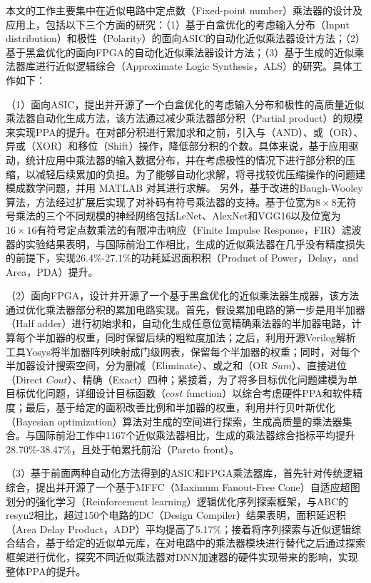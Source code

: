 本文的工作主要集中在近似电路中定点数（Fixed-point number）乘法器的设计及应用上，包括以下三个方面的研究：（1）基于白盒优化的考虑输入分布（Input distribution）和极性（Polarity）的面向ASIC的自动化近似乘法器设计方法；（2）基于黑盒优化的面向FPGA的自动化近似乘法器设计方法；（3）基于生成的近似乘法器库进行近似逻辑综合（Approximate Logic Synthesis，ALS）\cite{AC:ALS:survey}的研究。具体工作如下：

（1）面向ASIC，提出并开源了一个白盒优化的考虑输入分布和极性的高质量近似乘法器自动化生成方法，该方法通过减少乘法器部分积（Partial product）的规模来实现PPA的提升。在对部分积进行累加求和之前，引入与（AND）、或（OR）、异或（XOR）和移位（Shift）操作，降低部分积的个数。具体来说，基于应用驱动，统计应用中乘法器的输入数据分布，并在考虑极性的情况下进行部分积的压缩，以减轻后续累加的负担。为了能够自动化求解，将寻找较优压缩操作的问题建模成数学问题，并用 MATLAB 对其进行求解。
另外，基于改进的Baugh-Wooley算法\cite{EM:baugh-wooley,EM:baugh-wooley_modified_PP_reorga,EM:baugh-wooley_diff}，方法经过扩展后实现了对补码有符号乘法器的支持。基于位宽为$8\times8$无符号乘法的三个不同规模的神经网络包括LeNet、AlexNet和VGG16以及位宽为$16\times16$有符号定点数乘法的有限冲击响应（Finite Impulse Response，FIR）滤波器的实验结果表明，与国际前沿工作相比，生成的近似乘法器在几乎没有精度损失的前提下，实现26.4\%-27.1\%的功耗延迟面积积（Product of Power，Delay，and Area，PDA）提升。

（2）面向FPGA，设计并开源了一个基于黑盒优化的近似乘法器生成器，该方法通过优化乘法器部分积的累加电路实现。首先，假设累加电路的第一步是用半加器（Half adder）进行初始求和，自动化生成任意位宽精确乘法器的半加器电路，计算每个半加器的权重，同时保留后续的粗粒度加法；之后，利用开源Verilog解析工具Yosys\cite{LS:yosys}将半加器阵列映射成门级网表，保留每个半加器的权重；同时，对每个半加器设计搜索空间，分为删减（Eliminate）、或之和（OR $Sum$）、直接进位（Direct $Cout$）、精确（Exact）四种；紧接着，为了将多目标优化问题建模为单目标优化问题，详细设计目标函数（$cost$ function）以综合考虑硬件PPA和软件精度；最后，基于给定的面积改善比例和半加器的权重，利用并行贝叶斯优化（Bayesian optimization）算法对生成的空间进行探索，生成高质量的乘法器集合。与国际前沿工作中1167个近似乘法器相比，生成的乘法器综合指标平均提升28.70\%-38.47\%，且处于帕累托前沿（Pareto front）。

（3）基于前面两种自动化方法得到的ASIC和FPGA乘法器库，首先针对传统逻辑综合，提出并开源了一个基于MFFC（Maximum Fanout-Free Cone）自适应超图划分的强化学习（Reinforcement learning）逻辑优化序列探索框架，与ABC\cite{LS:ABC}的resyn2相比，超过150个电路的DC（Design Compiler）结果表明，面积延迟积（Area Delay Product，ADP）平均提高了5.17\%；接着将序列探索与近似逻辑综合\cite{AC:ALS:survey}结合，基于给定的近似单元库，在对电路中的乘法器模块进行替代之后通过探索框架进行优化，探究不同近似乘法器对DNN加速器的硬件实现带来的影响，实现整体PPA的提升。

